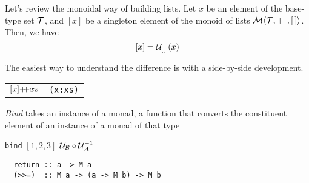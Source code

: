 Let's review the monoidal way of building lists. Let $x$ be an element of the base-type set $\mathcal{T}$, and $[x]$ be a singleton element of the monoid of lists $\Mon{\T}{\pp}{\emptylist}$. Then, we have
$$[x]=\mathcal{U}_{\mathcal{[\,]}}\left(x\right)$$


The easiest way to understand the difference is with a side-by-side development. 


\begin{center}
\begin{tabular}{cc}
  $[x]\pp xs$ & \verb"(x:xs)" \\
\end{tabular}
\end{center}


\emph{Bind} takes an instance of a monad, a function that converts the constituent element of an instance of a monad of that type


\verb"bind" $[1,2,3]$ $\mathcal{U}_{\mathcal{B}}\circ{\mathcal{U}}^{-1}_{\mathcal{A}}$


\begin{verbatim}
  return :: a -> M a
  (>>=)  :: M a -> (a -> M b) -> M b
\end{verbatim}